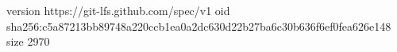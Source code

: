 version https://git-lfs.github.com/spec/v1
oid sha256:c5a87213bb89748a220ccb1ea0a2dc630d22b27ba6c30b636f6ef0fea626e148
size 2970
